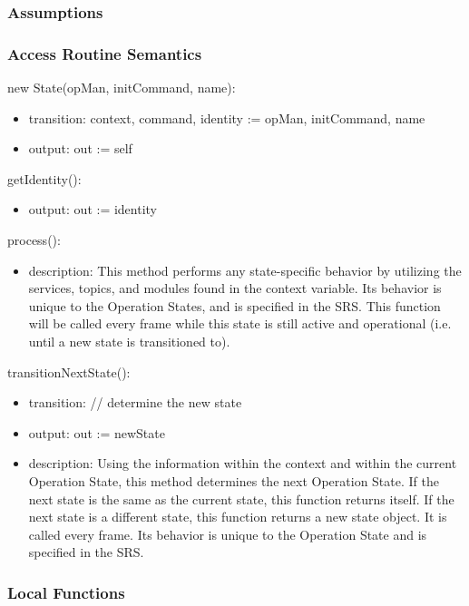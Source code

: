\documentclass[12pt, titlepage]{article}
\begin{document}
\subsubsection{Assumptions}
\subsubsection{Access Routine Semantics}

\noindent new State(opMan, initCommand, name):
\begin{itemize}
\item transition: context, command, identity := opMan, initCommand, name 
\item output: out := self
\end{itemize}

\noindent getIdentity():
\begin{itemize}
\item output: out := identity
\end{itemize}

\noindent process():
\begin{itemize}
\item description: This method performs any state-specific behavior by utilizing the  services, topics, and modules found in the context variable. Its behavior is unique to the Operation States, and is specified in the SRS. This function will be called every frame while this state is still active and operational (i.e. until a new state is transitioned to). 
\end{itemize}
\noindent transitionNextState():
\begin{itemize}
\item transition: // determine the new state
\item output: out := newState
\item description: Using the information within the context and within the current Operation State, this method determines the next Operation State. If the next state is the same as the current state, this function returns itself. If the next state is a different state, this function returns a new state object. It is called every frame. Its behavior is unique to the Operation State and is specified in the SRS. 
\end{itemize}


\subsubsection{Local Functions}
\newpage
\end{document}
